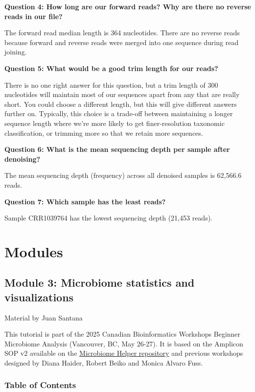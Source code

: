 \documentclass[
]{book}
\begin{document}
\textbf{Question 4: How long are our forward reads? Why are there no reverse reads in our file?}

The forward read median length is 364 nucleotides. There are no reverse reads because forward and reverse reads were merged into one sequence during read joining.

\textbf{Question 5: What would be a good trim length for our reads?}

There is no one right answer for this question, but a trim length of 300 nucleotides will maintain most of our sequences apart from any that are really short. You could choose a different length, but this will give different answers further on. Typically, this choice is a trade-off between maintaining a longer sequence length where we're more likely to get finer-resolution taxonomic classification, or trimming more so that we retain more sequences.

\textbf{Question 6: What is the mean sequencing depth per sample after denoising?}

The mean sequencing depth (frequency) across all denoised samples is 62,566.6 reads.

\textbf{Question 7: Which sample has the least reads?}

Sample CRR1039764 has the lowest sequencing depth (21,453 reads).

\part{Modules}\label{part-modules-2}

\chapter{Module 3: Microbiome statistics and visualizations}\label{module-3-microbiome-statistics-and-visualizations}

Material by Juan Santana

This tutorial is part of the 2025 Canadian Bioinformatics Workshops Beginner Microbiome Analysis (Vancouver, BC, May 26-27). It is based on the Amplicon SOP v2 available on the \href{https://github.com/LangilleLab/microbiome_helper/wiki/Amplicon-SOP-v2-(qiime2-2022.11)}{Microbiome Helper repository} and previous workshops designed by Diana Haider, Robert Beiko and Monica Alvaro Fuss.

\section{Table of Contents}\label{table-of-contents-1}
\end{document}
